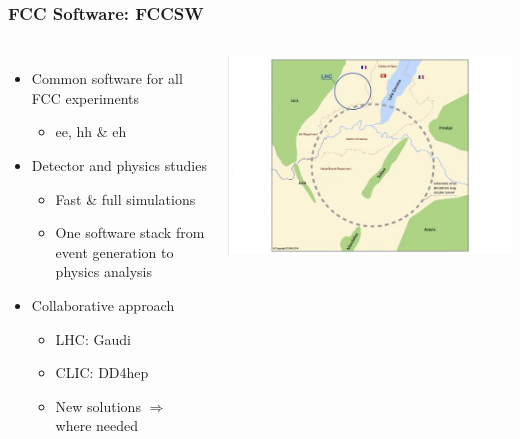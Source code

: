 \documentclass[hyperref={colorlinks=true,pdfpagelabels=false,linkcolor=black}, xcolor=dvipsnames,10pt]{beamer}
\begin{document}
\begin{frame}
	\frametitle{FCC Software: FCCSW}
	
	\begin{columns}
	\begin{itemize}
	\item Common software for all FCC experiments
		\begin{itemize}
		\item ee, hh \& eh
		\end{itemize}
	\item Detector and physics studies
		\begin{itemize}
		\item Fast \& full simulations
		\item One software stack from event generation to physics analysis
		\end{itemize}
	\item Collaborative approach
		\begin{itemize}
		\item LHC: Gaudi
		\item CLIC: DD4hep
		\item New solutions $\Rightarrow$ where needed
		\end{itemize}
	\end{itemize}
	
	\centering
	\includegraphics[width=\textwidth]{../figures/cernFCC}
	\end{columns}
	

\end{frame}
\end{document}
